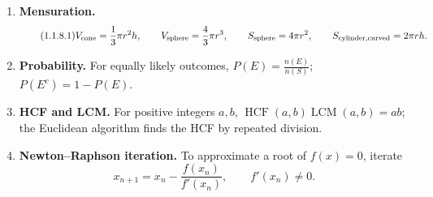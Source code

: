 \begin{enumerate}[label=\normalfont 1.1.\arabic*.,ref=1.1.\arabic*]
\item \label{formula-1-1-8} \textbf{Mensuration.}
\begin{equation*}\tag{1.1.8.1}
V_{\rm cone}=\frac13\pi r^2h,\qquad
V_{\rm sphere}=\frac43\pi r^3,\qquad
S_{\rm sphere}=4\pi r^2,\qquad
S_{\rm cylinder,curved}=2\pi rh.
\end{equation*}
\item \label{formula-1-1-9} \textbf{Probability.} For equally likely outcomes, $P(E)=\frac{n(E)}{n(S)}$; $P(E^c)=1-P(E)$.
\item \label{formula-1-1-10} \textbf{HCF and LCM.} For positive integers $a,b$, $\operatorname{HCF}(a,b)\operatorname{LCM}(a,b)=ab$; the Euclidean algorithm finds the HCF by repeated division.
\item \label{formula-1-1-11} \textbf{Newton--Raphson iteration.} To approximate a root of $f(x)=0$, iterate
\begin{equation*}\tag{1.1.11.1}
x_{n+1}=x_n-\frac{f(x_n)}{f'(x_n)},\qquad f'(x_n)\ne0.
\end{equation*}
\end{enumerate}
